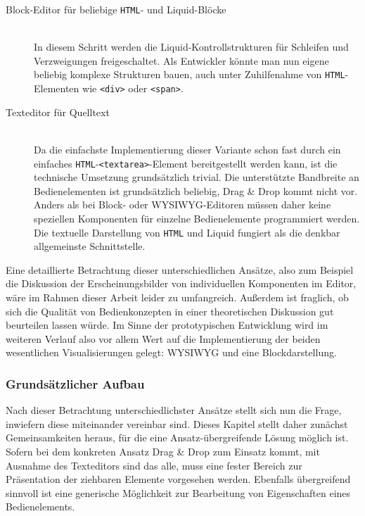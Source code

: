 \begin{description}
\item[ Block-Editor für beliebige \texttt{HTML}- und Liquid-Blöcke] \hfill \\
  In diesem Schritt werden die Liquid-Kontrollstrukturen für Schleifen und Verzweigungen freigeschaltet. Als Entwickler könnte man nun eigene beliebig komplexe Strukturen bauen, auch unter Zuhilfenahme von \texttt{HTML}-Elementen wie \texttt{<div>} oder \texttt{<span>}.
  
\item[ Texteditor für Quelltext] \hfill \\
  Da die einfachste Implementierung dieser Variante schon fast durch ein einfaches \texttt{HTML}-\texttt{<textarea>}-Element bereitgestellt werden kann, ist die technische Umsetzung grundsätzlich trivial. Die unterstützte Bandbreite an Bedienelementen ist grundsätzlich beliebig, Drag \& Drop kommt nicht vor. Anders als bei Block- oder WYSIWYG-Editoren müssen daher keine speziellen Komponenten für einzelne Bedienelemente programmiert werden. Die textuelle Darstellung von \texttt{HTML} und Liquid fungiert als die denkbar allgemeinste Schnittstelle.  
\end{description}

Eine detaillierte Betrachtung dieser unterschiedlichen Ansätze, also zum Beispiel die Diskussion der Erscheinungsbilder von individuellen Komponenten im Editor, wäre im Rahmen dieser Arbeit leider zu umfangreich. Außerdem ist fraglich, ob sich die Qualität von Bedienkonzepten in einer theoretischen Diskussion gut beurteilen lassen würde. Im Sinne der prototypischen Entwicklung wird im weiteren Verlauf also vor allem Wert auf die Implementierung der beiden wesentlichen Visualisierungen gelegt: WYSIWYG und eine Blockdarstellung.

\subsubsection{Grundsätzlicher Aufbau}
\label{sec:design-ui-editor}

Nach dieser Betrachtung unterschiedlichster Ansätze stellt sich nun die Frage, inwiefern diese miteinander vereinbar sind. Dieses Kapitel stellt daher zunächst Gemeinsamkeiten heraus, für die eine Ansatz-übergreifende Lösung möglich ist. Sofern bei dem konkreten Ansatz Drag \& Drop zum Einsatz kommt, mit Ausnahme des Texteditors sind das alle, muss eine fester Bereich zur Präsentation der ziehbaren Elemente vorgesehen werden. Ebenfalls übergreifend sinnvoll ist eine generische Möglichkeit zur Bearbeitung von Eigenschaften eines Bedienelements.

